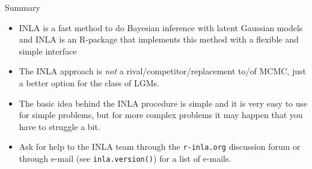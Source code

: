 \documentclass[
  ignorenonframetext,
]{beamer}
\begin{document}
\begin{frame}[fragile]{Summary}
\protect\hypertarget{summary}{}
\begin{itemize}
\item
  INLA is a fast method to do Bayesian inference with latent Gaussian
  models and INLA is an R-package that implements this method with a
  flexible and simple interface
\item
  The INLA approach is \emph{not} a rival/competitor/replacement to/of
  MCMC, just a better option for the class of LGMs.
\item
  The basic idea behind the INLA procedure is simple and it is very easy
  to use for simple problems, but for more complex problems it may
  happen that you have to struggle a bit.
\item
  Ask for help to the INLA team through the \texttt{r-inla.org}
  discussion forum or through e-mail (see \texttt{inla.version()}) for a
  list of e-mails.
\end{itemize}
\end{frame}
\end{document}
